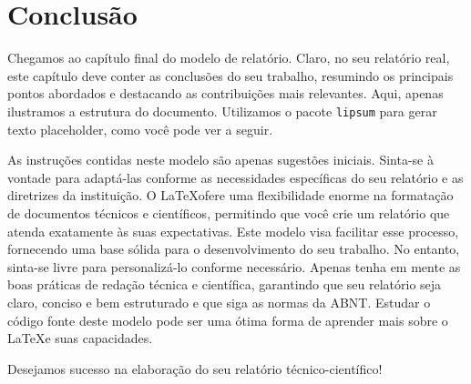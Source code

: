 \chapter{Conclusão}\label{cap:conclusao}

Chegamos ao capítulo final do modelo de relatório. Claro, no seu relatório real, este capítulo deve
conter as conclusões do seu trabalho, resumindo os principais pontos abordados e destacando as
contribuições mais relevantes. Aqui, apenas ilustramos a estrutura do documento. Utilizamos o pacote
\texttt{lipsum} para gerar texto placeholder, como você pode ver a seguir.

\lipsum[6-7]

As instruções contidas neste modelo são apenas sugestões iniciais. Sinta-se à vontade para
adaptá-las conforme as necessidades específicas do seu relatório e as diretrizes da instituição.
O \LaTeX ofere uma flexibilidade enorme na formatação de documentos técnicos e científicos,
permitindo que você crie um relatório que atenda exatamente às suas expectativas. Este modelo visa
facilitar esse processo, fornecendo uma base sólida para o desenvolvimento do seu trabalho. No
entanto, sinta-se livre para personalizá-lo conforme necessário. Apenas tenha em mente as boas
práticas de redação técnica e científica, garantindo que seu relatório seja claro, conciso e bem
estruturado e que siga as normas da ABNT. Estudar o código fonte deste modelo pode ser uma ótima
forma de aprender mais sobre o \LaTeX e suas capacidades.

Desejamos sucesso na elaboração do seu relatório técnico-científico!